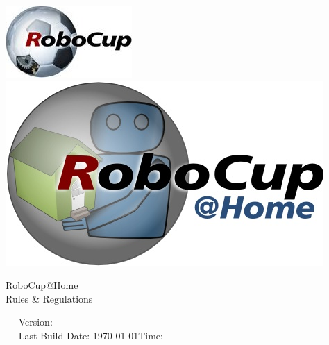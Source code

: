 \begin{titlepage}
  \begin{center}
    {
      \includegraphics[width=.25\textwidth]{images/logo_RoboCupFed.jpg}
      \hfill
      \includegraphics[width=.25\textwidth]{images/logo_RoboCupAtHome.jpg}\\[1.23ex]
    }
    \vspace{2.7 cm}
    \hrulefill\par
    {%
      \vspace*{.27cm}
      \Huge{RoboCup@Home}\\[1.23ex]
      \Large Rules \& Regulations \\[2ex]
    }
    \hrulefill\par
    \vfill
    ~~ Version: \YEAR \quad \svnRevision ~~ \\
    ~~ Last Build Date: \today \quad Time: \the\time ~~ \\
    ~~ \svnChangeData ~~ %
  \end{center}
\end{titlepage}
